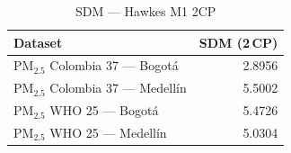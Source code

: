 \begin{table}[htbp]
\centering
\caption{SDM --- Hawkes M1 2CP}
\label{tab:hawkes_sdm_2cp}
\begin{tabular}{lr}
\toprule
Dataset & SDM (2\,CP) \\
\midrule
PM$_{2.5}$ Colombia 37 --- Bogot\'{a} & 2.8956 \\
PM$_{2.5}$ Colombia 37 --- Medell\'{i}n & 5.5002 \\
PM$_{2.5}$ WHO 25 --- Bogot\'{a} & 5.4726 \\
PM$_{2.5}$ WHO 25 --- Medell\'{i}n & 5.0304 \\
\bottomrule
\end{tabular}
\end{table}
